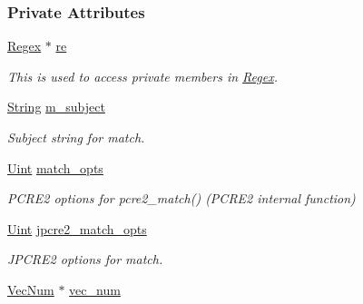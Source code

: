 \subsubsection*{Private Attributes}
\begin{DoxyCompactItemize}
\item 
\hyperlink{classjpcre2_1_1Regex}{Regex} $\ast$ \hyperlink{classjpcre2_1_1RegexMatch_a7743b27db00c1e13d8fee51b70d5a133}{re}\hypertarget{classjpcre2_1_1RegexMatch_a7743b27db00c1e13d8fee51b70d5a133}{}\label{classjpcre2_1_1RegexMatch_a7743b27db00c1e13d8fee51b70d5a133}

\begin{DoxyCompactList}\small\item\em This is used to access private members in \hyperlink{classjpcre2_1_1Regex}{Regex}. \end{DoxyCompactList}\item 
\hyperlink{namespacejpcre2_a91f03070152fb228bc116c5a737f1d16}{String} \hyperlink{classjpcre2_1_1RegexMatch_a9df4f1897e7fa33e05a9f6f938992ca7}{m\+\_\+subject}\hypertarget{classjpcre2_1_1RegexMatch_a9df4f1897e7fa33e05a9f6f938992ca7}{}\label{classjpcre2_1_1RegexMatch_a9df4f1897e7fa33e05a9f6f938992ca7}

\begin{DoxyCompactList}\small\item\em Subject string for match. \end{DoxyCompactList}\item 
\hyperlink{namespacejpcre2_a078242d38221a13fb3543b9edd78c099}{Uint} \hyperlink{classjpcre2_1_1RegexMatch_a697d5731007350b0f20d2018fcfafa90}{match\+\_\+opts}\hypertarget{classjpcre2_1_1RegexMatch_a697d5731007350b0f20d2018fcfafa90}{}\label{classjpcre2_1_1RegexMatch_a697d5731007350b0f20d2018fcfafa90}

\begin{DoxyCompactList}\small\item\em P\+C\+R\+E2 options for pcre2\+\_\+match() (P\+C\+R\+E2 internal function) \end{DoxyCompactList}\item 
\hyperlink{namespacejpcre2_a078242d38221a13fb3543b9edd78c099}{Uint} \hyperlink{classjpcre2_1_1RegexMatch_a70d62df887eeed237724f64fbc378700}{jpcre2\+\_\+match\+\_\+opts}\hypertarget{classjpcre2_1_1RegexMatch_a70d62df887eeed237724f64fbc378700}{}\label{classjpcre2_1_1RegexMatch_a70d62df887eeed237724f64fbc378700}

\begin{DoxyCompactList}\small\item\em J\+P\+C\+R\+E2 options for match. \end{DoxyCompactList}\item 
\hyperlink{namespacejpcre2_ac1cf752c8fbb0be78020be3b80e77ce3}{Vec\+Num} $\ast$ \hyperlink{classjpcre2_1_1RegexMatch_a836705e0444568c78abaab4c8e351335}{vec\+\_\+num}\hypertarget{classjpcre2_1_1RegexMatch_a836705e0444568c78abaab4c8e351335}{}\label{classjpcre2_1_1RegexMatch_a836705e0444568c78abaab4c8e351335}


\end{DoxyCompactItemize}
